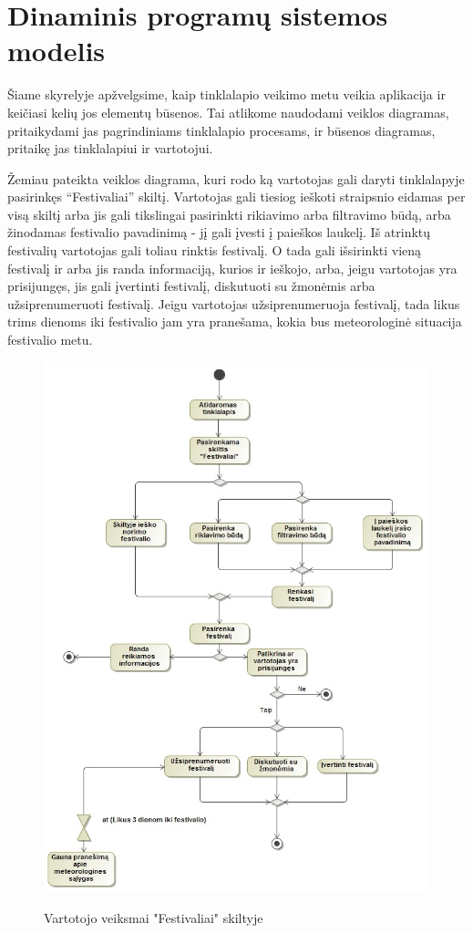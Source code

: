 ﻿\documentclass{VUMIFPSkursinis}
\begin{document}
\section{Dinaminis programų sistemos modelis}

Šiame skyrelyje apžvelgsime, kaip tinklalapio veikimo metu veikia aplikacija ir keičiasi kelių jos elementų būsenos. Tai atlikome naudodami veiklos diagramas, pritaikydami jas pagrindiniams tinklalapio procesams, ir būsenos diagramas, pritaikę jas tinklalapiui ir vartotojui.


Žemiau pateikta veiklos diagrama, kuri rodo ką vartotojas gali daryti tinklalapyje pasirinkęs “Festivaliai” skiltį. Vartotojas gali tiesiog ieškoti straipsnio eidamas per visą skiltį arba jis gali tikslingai pasirinkti rikiavimo arba filtravimo būdą, arba žinodamas festivalio pavadinimą - jį gali įvesti į paieškos laukelį. Iš atrinktų festivalių vartotojas gali toliau rinktis festivalį. O tada gali išsirinkti vieną festivalį ir arba jis randa informaciją, kurios ir ieškojo, arba, jeigu vartotojas yra prisijungęs, jis gali įvertinti festivalį, diskutuoti su žmonėmis arba užsiprenumeruoti festivalį. Jeigu vartotojas užsiprenumeruoja festivalį, tada likus trims dienoms iki festivalio jam yra pranešama, kokia bus meteorologinė situacija festivalio metu.

\begin{figure}[H]
	\centering
    \includegraphics[scale=0.5]{img/Pav/VartotojasFestivalis}
	\label{uml:22}
	\caption{Vartotojo veiksmai "Festivaliai" skiltyje}
\end{figure}
\end{document}
